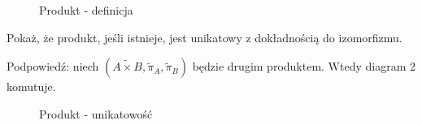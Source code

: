 \begin{figure}
  \centering

  \caption{Produkt - definicja}
  \label{fig:produkt}
\end{figure}

\begin{prob}
  Pokaż, że produkt, jeśli istnieje, jest unikatowy z dokładnością do izomorfizmu.

  Podpowiedź: niech $(\tilde{A\times B}, \tilde \pi_A, \tilde \pi_B)$ będzie drugim produktem. Wtedy diagram 2 komutuje.
\end{prob}

\begin{figure}
  \centering

  \caption{Produkt - unikatowość}
  \label{fig:produkt}
\end{figure}


